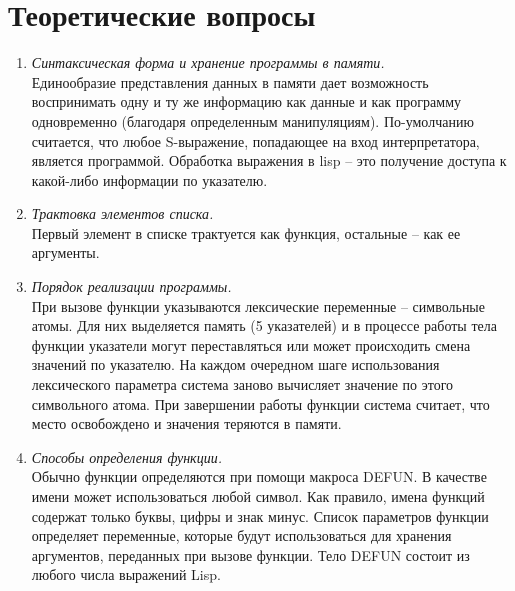 \chapter{Теоретические вопросы}

\begin{enumerate}[wide=0pt]
\item \textit{Синтаксическая форма и хранение программы в памяти.} \\
Единообразие представления данных в памяти дает возможность воспринимать одну и ту же информацию как данные и как программу одновременно (благодаря определенным манипуляциям). По-умолчанию считается, что любое S-выражение, попадающее на вход интерпретатора, является программой. Обработка выражения в lisp -- это получение доступа к какой-либо информации по указателю. 
\item \textit{Трактовка элементов списка.} \\
Первый элемент в списке трактуется как функция, остальные -- как ее аргументы. 
\item \textit{Порядок реализации программы.} \\
При вызове функции указываются лексические переменные -- символьные атомы. Для них выделяется память (5 указателей) и в процессе работы тела функции указатели могут переставляться или может происходить смена значений по указателю. На каждом очередном шаге использования лексического параметра система заново вычисляет значение по этого символьного атома. При завершении работы функции система считает, что место освобождено и значения теряются в памяти.  
\item \textit{Способы определения функции.} \\
Обычно функции определяются при помощи макроса DEFUN. В качестве имени может использоваться любой символ. Как правило, имена функций содержат только буквы, цифры и знак минус. Список параметров функции определяет переменные, которые будут использоваться для хранения аргументов, переданных при вызове функции. Тело DEFUN состоит из любого числа выражений Lisp. 
\end{enumerate}
